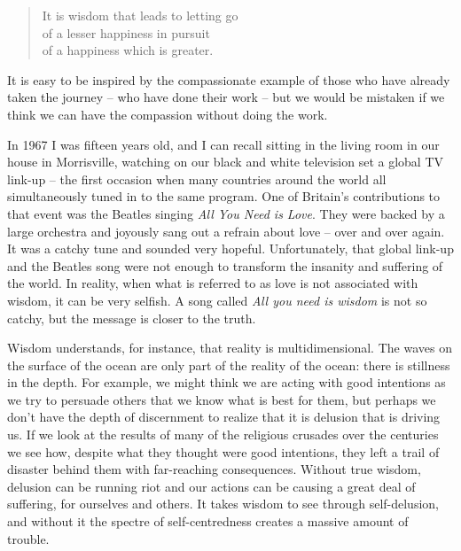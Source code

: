 \begin{quote}
  It is wisdom that leads to letting go\\
  of a lesser happiness in pursuit\\
  of a happiness which is greater.
\end{quote}

It is easy to be inspired by the compassionate example of those who have
already taken the journey -- who have done their work -- but we would be
mistaken if we think we can have the compassion without doing the work.

In 1967 I was fifteen years old, and I can recall sitting in the living
room in our house in Morrisville, watching on our black and white
television set a global TV link-up\cite{satellite}
 -- the first occasion when many countries around
the world all simultaneously tuned in to the same program. One of
Britain's contributions to that event was the Beatles singing \emph{All
You Need is Love}. They were backed by a large orchestra and joyously
sang out a refrain about love -- over and over again. It
was a catchy tune and sounded very hopeful. Unfortunately, that global
link-up and the Beatles song were not enough to transform the insanity
and suffering of the world. In reality, when what is referred to as love
is not associated with wisdom, it can be very selfish. A song called
\emph{All you need is wisdom} is not so catchy, but the message is
closer to the truth.

Wisdom understands, for instance, that reality is multidimensional. The
waves on the surface of the ocean are only part of the reality of the
ocean: there is stillness in the depth. For example, we might think we
are acting with good intentions as we try to persuade others that we
know what is best for them, but perhaps we don't have the depth of
discernment to realize that it is delusion that is driving us. If we
look at the results of many of the religious crusades over the centuries
we see how, despite what they thought were good intentions, they left a
trail of disaster behind them with far-reaching consequences. Without
true wisdom, delusion can be running riot and our actions can be causing
a great deal of suffering, for ourselves and others. It takes wisdom to
see through self-delusion, and without it the spectre of
self-centredness creates a massive amount of trouble.

\enlargethispage{\baselineskip}

